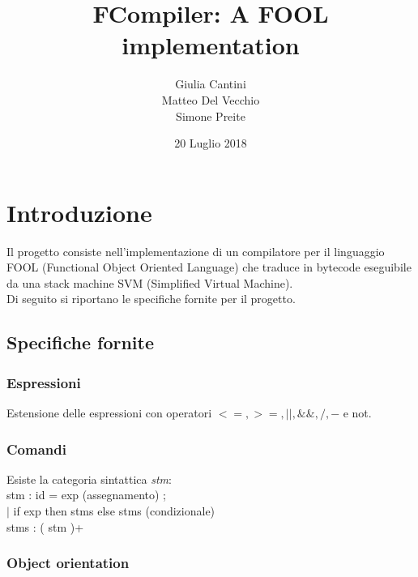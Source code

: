 \documentclass[a4paper]{article}   %
\begin{document}
\title{FCompiler: A FOOL implementation}
\author{Giulia Cantini\\
        Matteo Del Vecchio\\
        Simone Preite}
\date{20 Luglio 2018}    %
\maketitle

\tableofcontents

\section{Introduzione}

Il progetto consiste nell'implementazione di un compilatore per il linguaggio FOOL (Functional Object Oriented Language) che traduce in bytecode
eseguibile da una stack machine SVM (Simplified Virtual Machine).\\

Di seguito si riportano le specifiche fornite per il progetto.

\subsection{Specifiche fornite}

\subsubsection{Espressioni}

Estensione delle espressioni con operatori $ <=,  >=, || , \&\&, / ,  - $
   e not.

\subsubsection{Comandi}

Esiste la categoria sintattica \textit{stm}:\\

stm : 	id = exp (assegnamento) ; \\
	$|$ if exp then { stms } else { stms } (condizionale)\\

stms :  ( stm )+

\subsubsection{Object orientation}
\end{document}
